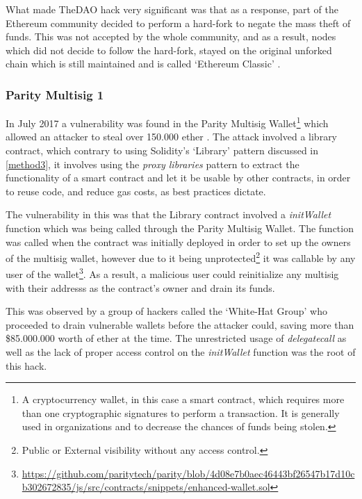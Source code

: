 What made TheDAO hack very significant was that as a response, part of the Ethereum community decided to perform a hard-fork to negate the mass theft of funds. This was not accepted by the whole community, and as a result, nodes which did not decide to follow the hard-fork, stayed on the original unforked chain which is still maintained and is called `Ethereum Classic' \cite{etc}. 

\subsubsection{Parity Multisig 1}
In July 2017 a vulnerability was found in the Parity Multisig Wallet\footnote{A cryptocurrency wallet, in this case a smart contract, which requires more than one cryptographic signatures to perform a transaction. It is generally used in organizations and to decrease the chances of funds being stolen.} which allowed an attacker to steal over 150.000 ether \cite{parityhack}. The attack involved a library contract, which contrary to using Solidity's `Library' pattern discussed in \ref{method3}, it involves using the \textit{proxy libraries} pattern \cite{proxylibraries} to extract the functionality of a smart contract and let it be usable by other contracts, in order to reuse code, and reduce gas costs, as best practices dictate.

The vulnerability in this was that the Library contract involved a \textit{initWallet} function which was being called through the Parity Multisig Wallet. The function was called when the contract was initially deployed in order to set up the owners of the multisig wallet, however due to it being unprotected\footnote{Public or External visibility without any access control.} it was callable by any user of the wallet\footnote{\url{https://github.com/paritytech/parity/blob/4d08e7b0aec46443bf26547b17d10cb302672835/js/src/contracts/snippets/enhanced-wallet.sol}}. As a result, a malicious user could reinitialize any multisig with their addresss as the contract's owner and drain its funds.

This was observed by a group of hackers called the `White-Hat Group' who proceeded to drain vulnerable wallets before the attacker could, saving more than \$85.000.000 worth of ether at the time. The unrestricted usage of \textit{delegatecall} as well as the lack of proper access control on the \textit{initWallet} function was the root of this hack. 

